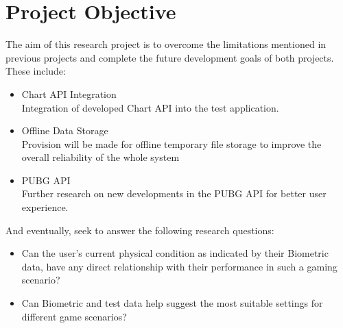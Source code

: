 \section*{Project Objective}
The aim of this research project is to overcome the limitations mentioned in previous projects and complete the future development goals of both projects.
These include:

\begin{itemize}
\item {Chart API Integration}\\
Integration of developed Chart API into the test application.
\item {Offline Data Storage}\\
Provision will be made for offline temporary file storage to improve the overall reliability of the whole system
\item{PUBG API}\\
Further research on new developments in the PUBG API for better user experience. 
\end{itemize} 
        
And eventually, seek to answer the following research questions:
\begin{itemize}
\item {Can the user's current physical condition as indicated by their Biometric data, have any direct relationship with their performance in such a gaming scenario?}
\item {Can Biometric and test data help suggest the most suitable settings for different game scenarios?}
\end{itemize}




